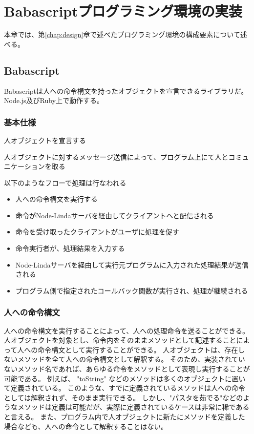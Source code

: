 \chapter{Babascriptプログラミング環境の実装}
\label{chap:implementation}

本章では、第\ref{chap:design}章で述べたプログラミング環境の構成要素について述べる。

\section{Babascript}\label{babascript}

Babascriptは人への命令構文を持ったオブジェクトを宣言できるライブラリだ。
Node.js及びRuby上で動作する。

\subsection{基本仕様}\label{ux57faux672cux4ed5ux69d8}

人オブジェクトを宣言する

人オブジェクトに対するメッセージ送信によって、プログラム上にて人とコミュニケーションを取る

以下のようなフローで処理は行なわれる

\begin{itemize}
\itemsep1pt\parskip0pt
\item
  人への命令構文を実行する
\item
  命令がNode-Lindaサーバを経由してクライアントへと配信される
\item
  命令を受け取ったクライアントがユーザに処理を促す
\item
  命令実行者が、処理結果を入力する
\item
  Node-Lindaサーバを経由して実行元プログラムに入力された処理結果が送信される
\item
  プログラム側で指定されたコールバック関数が実行され、処理が継続される
\end{itemize}

\subsection{人への命令構文}\label{ux4ebaux3078ux306eux547dux4ee4ux69cbux6587}

人への命令構文を実行することによって、人への処理命令を送ることができる。
人オブジェクトを対象とし、命令内をそのままメソッドとして記述することによって人への命令構文として実行することができる。
人オブジェクトは、存在しないメソッドを全て人への命令構文として解釈する。
そのため、実装されていないメソッド名であれば、あらゆる命令をメソッドとして表現し実行することが可能である。
例えば、 "toString"
などのメソッドは多くのオブジェクトに置いて定義されている。
このような、すでに定義されているメソッドは人への命令としては解釈されず、そのまま実行できる。
しかし、"パスタを茹でる"などのようなメソッドは定義は可能だが、実際に定義されているケースは非常に稀であると言える。
また、プログラム内で人オブジェクトに新たにメソッドを定義した場合なども、人への命令として解釈することはない。

